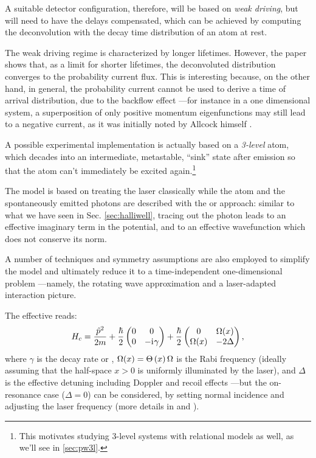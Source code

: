 A suitable detector configuration, therefore, will be based on \emph{weak driving},
but will need to have the delays compensated,
which can be achieved
by computing the
deconvolution with the decay time distribution of an atom at rest.

The weak driving regime is characterized by longer lifetimes.
However, the paper shows that,
as a limit for shorter lifetimes,
the deconvoluted distribution converges
to
the probability current flux.
This is interesting because, on the other hand, in general,
the probability current cannot be used to derive a time of arrival
distribution, due to the backflow effect
---for instance in a one dimensional system, a superposition of only positive momentum eigenfunctions may still lead to a
negative current, as it was initially noted by Allcock himself \parencite{Allcock-3}.

A possible experimental implementation is actually based on a \emph{3-level} atom,
which decades into an intermediate, metastable, 
``sink'' state after emission \parencite{Metastable, TQM2} so 
that the atom can't immediately be excited again.\footnote{
  This motivates studying 3-level systems with
  relational models as well, as we'll see in \ref{sec:pw3l}.
}

The model is based on treating the laser classically
while the atom and the spontaneously emitted photons are
described with the  or 
approach: similar to what we have seen in Sec. \ref{sec:halliwell},
tracing out the photon leads to an effective
imaginary term in the potential, and to an effective
wavefunction which does not conserve its norm.

A number of techniques and symmetry assumptions are also employed
to simplify the model and ultimately reduce it
to a time-independent one-dimensional problem
---namely,
the rotating wave approximation
and
a laser-adapted interaction picture.

The effective  reads:
\begin{equation}\label{eq:eff_atom_laser_detect_H}
  {H}_{c} = \frac{\hat{p}^2}{2m} +
  \frac{\hbar}{2} \left(
    \begin{matrix}
      0 & 0\\
      0 & -\iu\gamma
    \end{matrix}
  \right)
  +
  \frac{\hbar}{2} \left(
    \begin{matrix}%
      0         & \Omega(x)\\
      \Omega(x) & -2\Delta
    \end{matrix}
  \right)
  \text{,}
\end{equation}
where $\gamma$ is the decay rate or ,
$\Omega(x) = \Theta\left(x\right)\Omega$ is the Rabi frequency (ideally assuming that the half-space $x>0$ is uniformly illuminated by the laser),
and $\Delta$ is the effective detuning including Doppler and recoil effects
---but the on-resonance case ($\Delta=0$) can be considered,
by setting normal incidence and adjusting the laser frequency
(more details in \cite{Damborenea} and \cite[\S 4.2]{TQM2}).

